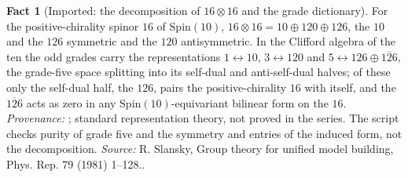 \documentclass[11pt]{article}
\theoremstyle{definition}
\newtheorem{fact}[theorem]{Fact}
\theoremstyle{plain}
\begin{document}
\begin{fact}[Imported: the decomposition of $16 \otimes 16$ and the grade dictionary]\label{c:families.imported-decomposition-grade-dictionary}
For the positive-chirality spinor $16$ of $\mathrm{Spin}(10)$, $16 \otimes 16 = 10 \oplus 120 \oplus 126$, the $10$ and the $126$ symmetric and the $120$ antisymmetric. In the Clifford algebra of the ten the odd grades carry the representations $1 \leftrightarrow 10$, $3 \leftrightarrow 120$ and $5 \leftrightarrow 126 \oplus \overline{126}$, the grade-five space splitting into its self-dual and anti-self-dual halves; of these only the self-dual half, the $126$, pairs the positive-chirality $16$ with itself, and the $\overline{126}$ acts as zero in any $\mathrm{Spin}(10)$-equivariant bilinear form on the $16$. \emph{Provenance:} \cite{Slansky1981}; standard representation theory, not proved in the series. The script checks purity of grade five and the symmetry and entries of the induced form, not the decomposition.
\emph{Source:} R. Slansky, Group theory for unified model building, Phys. Rep. 79 (1981) 1--128..
\end{fact}
\end{document}

